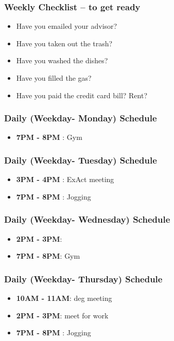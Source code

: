 \begin{frame} 
\frametitle{Weekly Checklist -- to get ready} 
\begin{itemize} 
\item Have you emailed your advisor? \\
\item Have you taken out the trash? \\
\item Have you washed the dishes? \\ 
\item Have you filled the gas? \\ 
\item Have you paid the credit card bill?  Rent? \\
\end{itemize} 
\end{frame}

\begin{frame} 
\frametitle{Daily (Weekday- Monday) Schedule} 
\begin{itemize} 
\item \textbf{7PM - 8PM} : Gym 
\end{itemize} 
\end{frame} 

\begin{frame} 
\frametitle{Daily (Weekday- Tuesday) Schedule} 
\begin{itemize} 
\item \textbf{3PM - 4PM} : ExAct meeting 
\item \textbf{7PM - 8PM} : Jogging 
\end{itemize} 
\end{frame} 

\begin{frame} 
\frametitle{Daily (Weekday- Wednesday) Schedule} 
\begin{itemize} 
\item \textbf{2PM - 3PM}:
\item \textbf{7PM - 8PM}: Gym 
\end{itemize} 
\end{frame}

\begin{frame} 
\frametitle{Daily (Weekday- Thursday) Schedule} 
\begin{itemize}
\item \textbf{10AM - 11AM}: deg meeting  
\item \textbf{2PM - 3PM}: meet for work
\item \textbf{7PM - 8PM} : Jogging  
\end{itemize} 
\end{frame}

